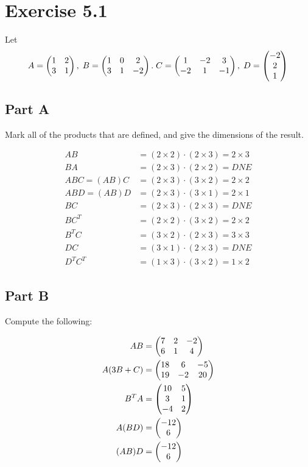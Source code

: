\section*{Exercise 5.1}
Let
\[
	A = \genericmat{p}{1&2\\3&1},\;
	B = \genericmat{p}{1&0&2\\3&1&-2}.\;
	C = \genericmat{p}{1&-2&3\\-2&1&-1},\;
	D = \genericmat{p}{-2\\2\\1}
\]

\subsection*{Part A} 

Mark all of the products that are defined, and give the dimensions of the result. 

\[
	\begin{aligned}
		AB &= (2 \times 2) \cdot (2 \times 3) = \boxed{2 \times 3} \\
		BA &= (2 \times 3) \cdot (2 \times 2) = \boxed{DNE} \\
		ABC = (AB)C &= (2 \times 3) \cdot (3 \times 2) = \boxed{2 \times 2} \\
		ABD = (AB)D &= (2 \times 3) \cdot (3 \times 1) = \boxed{2 \times 1} \\
		BC &= (2 \times 3) \cdot (2 \times 3) = \boxed{DNE} \\
		BC^T &= (2 \times 2) \cdot (3 \times 2) = \boxed{2 \times 2} \\
		B^TC &= (3 \times 2) \cdot (2 \times 3) = \boxed{3 \times 3} \\
		DC &= (3 \times 1) \cdot (2 \times 3) = \boxed{DNE} \\
		D^T C^T &= (1 \times 3) \cdot (3 \times 2) = \boxed{1 \times 2}
	\end{aligned}
\]

\subsection*{Part B}

Compute the following:

\[
	\begin{aligned}
		AB &= \genericmat{p}{7&2&-2\\6&1&4} \\
		A(3B+C) &= \genericmat{p}{18&6&-5\\19&-2&20} \\
		B^TA &= \genericmat{p}{10&5\\3&1\\-4&2} \\
		A(BD) &= \genericmat{p}{-12\\6} \\
		(AB)D &= \genericmat{p}{-12\\6} \\
	\end{aligned}
\]
